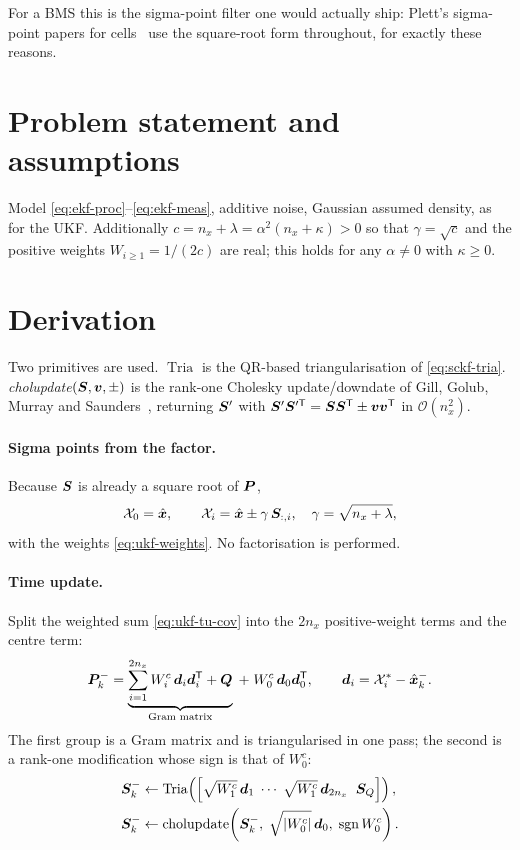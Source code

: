 For a BMS this is the sigma-point filter one would actually ship: Plett's sigma-point papers
for cells~\cite{plett2006spkf1,plett2006spkf2} use the square-root form throughout, for
exactly these reasons.

\section{Problem statement and assumptions}
Model \eqref{eq:ekf-proc}--\eqref{eq:ekf-meas}, additive noise, Gaussian assumed density, as
for the UKF. Additionally $c = n_x+\lambda = \alpha^2(n_x+\kappa) > 0$ so that
$\gamma = \sqrt{c}$ and the positive weights $W_{i\ge1} = 1/(2c)$ are real; this holds for
any $\alpha \neq 0$ with $\kappa \ge 0$.

\section{Derivation}
Two primitives are used. $\operatorname{Tria}$ is the QR-based triangularisation of
\eqref{eq:sckf-tria}. \emph{cholupdate}$(\bm{S},\bm v,\pm)$ is the rank-one Cholesky
update/downdate of Gill, Golub, Murray and Saunders~\cite{gillgolub1974}, returning $\bm{S}'$
with $\bm{S}'\bm{S}'^{\mathsf{T}} = \bm{S}\bm{S}^{\mathsf{T}} \pm \bm v\bm v^{\mathsf{T}}$ in $\mathcal{O}(n_x^2)$.

\paragraph{Sigma points from the factor.} Because $\bm{S}$ is already a square root of $\bm{P}$,
\begin{equation}
\mathcal{X}_0 = \hat{\bm{x}}, \qquad
\mathcal{X}_i = \hat{\bm{x}} \pm \gamma\,\bm{S}_{:,i}, \quad \gamma = \sqrt{n_x+\lambda},
\label{eq:srukf-sigma}
\end{equation}
with the weights \eqref{eq:ukf-weights}. No factorisation is performed.

\paragraph{Time update.} Split the weighted sum \eqref{eq:ukf-tu-cov} into the $2n_x$
positive-weight terms and the centre term:
\begin{equation}
\bm{P}^{-}_k
= \underbrace{\sum_{i=1}^{2n_x} W^c_i\,\bm{d}_i\bm{d}_i^{\mathsf{T}} + \bm{Q}}_{\text{Gram matrix}}
 \;+\; W_0^c\,\bm{d}_0\bm{d}_0^{\mathsf{T}},
\qquad \bm{d}_i = \mathcal{X}^*_i - \hat{\bm{x}}^{-}_k .
\label{eq:srukf-split}
\end{equation}
The first group is a Gram matrix and is triangularised in one pass; the second is a rank-one
modification whose sign is that of $W_0^c$:
\begin{align}
\bm{S}^-_k &\gets \operatorname{Tria}\!\left(\left[\sqrt{W^c_1}\,\bm{d}_1 \;\cdots\; \sqrt{W^c_1}\,\bm{d}_{2n_x}\;\; \bm{S}_Q\right]\right),
\label{eq:srukf-tu1}\\
\bm{S}^-_k &\gets \text{cholupdate}\!\left(\bm{S}^-_k,\; \sqrt{\left\lvert W_0^c \right\rvert}\,\bm{d}_0,\; \operatorname{sgn} W_0^c\right).
\label{eq:srukf-tu2}
\end{align}

